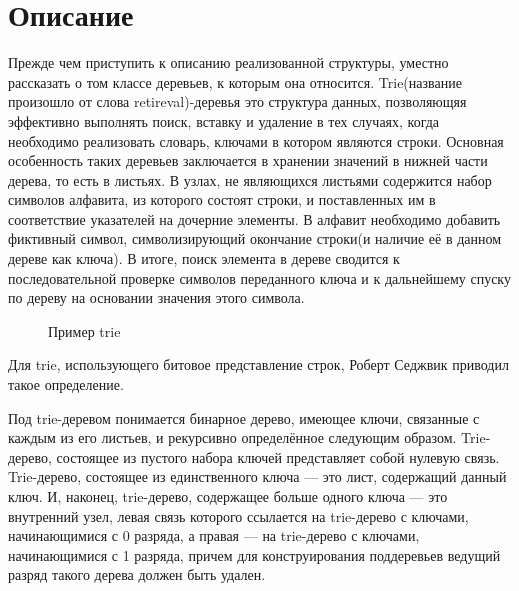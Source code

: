 \section{Описание}
Прежде чем приступить к описанию реализованной структуры,  уместно рассказать о том классе деревьев, к которым она относится. Trie(название произошло от слова retireval)-деревья это структура данных, позволяющяя эффективно выполнять поиск, вставку и удаление в тех случаях, когда необходимо реализовать словарь, ключами в котором являются строки. Основная особенность таких деревьев заключается в хранении значений в нижней части дерева, то есть в листьях. В узлах, не являющихся листьями содержится набор символов алфавита, из которого состоят строки, и поставленных им в соответствие указателей на дочерние элементы. В алфавит необходимо добавить фиктивный символ, символизирующий окончание строки(и наличие её в данном дереве как ключа).  В итоге, поиск элемента в дереве сводится к последовательной проверке символов переданного ключа и к дальнейшему спуску по дереву на основании значения этого символа.\\

\begin{figure}[hb]
\caption{Пример trie}
\label{fig:image}
\end{figure}

Для trie, использующего битовое представление строк, Роберт Седжвик приводил такое определение.
\begin{displayquote}
Под trie-деревом понимается бинарное дерево, имеющее ключи, связанные с каждым из его листьев, и рекурсивно определённое следующим образом. Trie-дерево, состоящее из пустого набора ключей представляет собой нулевую связь. Trie-дерево, состоящее из единственного ключа --- это лист, содержащий данный ключ. И, наконец, trie-дерево, содержащее больше одного ключа --- это внутренний узел, левая связь которого ссылается на trie-дерево с ключами, начинающимися с 0 разряда, а правая --- на trie-дерево с ключами, начинающимися с 1 разряда, причем для конструирования поддеревьев ведущий разряд такого дерева должен быть удален.\cite{Sedgewick}
\end{displayquote}

